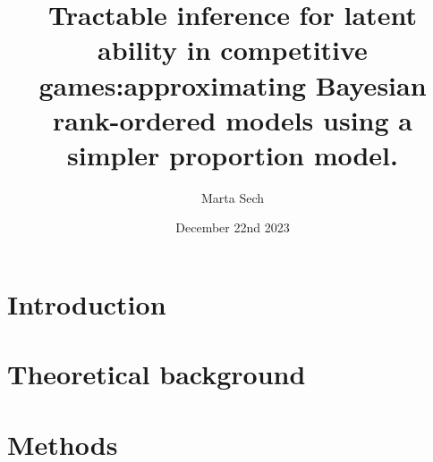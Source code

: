 \documentclass[12pt,twoside]{report}
\title{Tractable inference for latent ability in competitive games:approximating Bayesian rank-ordered models using a simpler proportion model.}\\
\author{Marta Sech}
\date{December 22nd 2023}
\begin{document}
 
 


\tableofcontents

\chapter{Introduction}


\chapter{Theoretical background}


\chapter{Methods}


\printbibliography
\end{document}
